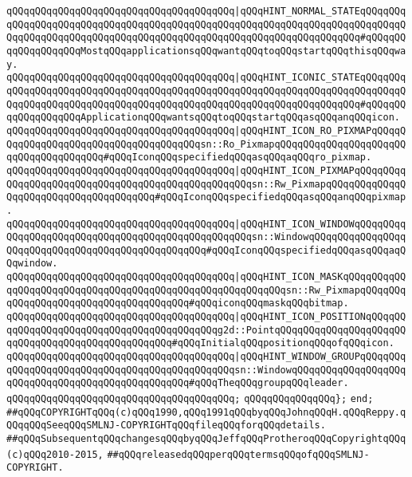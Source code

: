 \verb|qQQqqQQqqQQqqQQqqQQqqQQqqQQqqQQqqQQqqQQq|\verb#|qQQqHINT_NORMAL_STATEqQQqqQQqqQQqqQQqqQQqqQQqqQQqqQQqqQQqqQQqqQQqqQQqqQQqqQQqqQQqqQQqqQQqqQQqqQQqqQQqqQQqqQQqqQQqqQQqqQQqqQQqqQQqqQQqqQQqqQQqqQQqqQQqqQQqqQQqqQQq#\verb|#qQQqqQQqqQQqqQQqqQQqMostqQQqapplicationsqQQqwantqQQqtoqQQqstartqQQqthisqQQqway.|\newline
\verb|qQQqqQQqqQQqqQQqqQQqqQQqqQQqqQQqqQQqqQQq|\verb#|qQQqHINT_ICONIC_STATEqQQqqQQqqQQqqQQqqQQqqQQqqQQqqQQqqQQqqQQqqQQqqQQqqQQqqQQqqQQqqQQqqQQqqQQqqQQqqQQqqQQqqQQqqQQqqQQqqQQqqQQqqQQqqQQqqQQqqQQqqQQqqQQqqQQqqQQqqQQq#\verb|#qQQqqQQqqQQqqQQqqQQqApplicationqQQqwantsqQQqtoqQQqstartqQQqasqQQqanqQQqicon.|\newline
\verb|qQQqqQQqqQQqqQQqqQQqqQQqqQQqqQQqqQQqqQQq|\verb#|qQQqHINT_ICON_RO_PIXMAPqQQqqQQqqQQqqQQqqQQqqQQqqQQqqQQqqQQqqQQqsn::Ro_PixmapqQQqqQQqqQQqqQQqqQQqqQQqqQQqqQQqqQQqqQQq#\verb|#qQQqIconqQQqspecifiedqQQqasqQQqaqQQqro_pixmap.|\newline
\verb|qQQqqQQqqQQqqQQqqQQqqQQqqQQqqQQqqQQqqQQq|\verb#|qQQqHINT_ICON_PIXMAPqQQqqQQqqQQqqQQqqQQqqQQqqQQqqQQqqQQqqQQqqQQqqQQqqQQqsn::Rw_PixmapqQQqqQQqqQQqqQQqqQQqqQQqqQQqqQQqqQQqqQQq#\verb|#qQQqIconqQQqspecifiedqQQqasqQQqanqQQqpixmap.|\newline
\verb|qQQqqQQqqQQqqQQqqQQqqQQqqQQqqQQqqQQqqQQq|\verb#|qQQqHINT_ICON_WINDOWqQQqqQQqqQQqqQQqqQQqqQQqqQQqqQQqqQQqqQQqqQQqqQQqqQQqsn::WindowqQQqqQQqqQQqqQQqqQQqqQQqqQQqqQQqqQQqqQQqqQQqqQQqqQQq#\verb|#qQQqIconqQQqspecifiedqQQqasqQQqaqQQqwindow.|\newline
\verb|qQQqqQQqqQQqqQQqqQQqqQQqqQQqqQQqqQQqqQQq|\verb#|qQQqHINT_ICON_MASKqQQqqQQqqQQqqQQqqQQqqQQqqQQqqQQqqQQqqQQqqQQqqQQqqQQqqQQqqQQqsn::Rw_PixmapqQQqqQQqqQQqqQQqqQQqqQQqqQQqqQQqqQQqqQQq#\verb|#qQQqiconqQQqmaskqQQqbitmap.|\newline
\verb|qQQqqQQqqQQqqQQqqQQqqQQqqQQqqQQqqQQqqQQq|\verb#|qQQqHINT_ICON_POSITIONqQQqqQQqqQQqqQQqqQQqqQQqqQQqqQQqqQQqqQQqqQQqg2d::PointqQQqqQQqqQQqqQQqqQQqqQQqqQQqqQQqqQQqqQQqqQQqqQQqqQQq#\verb|#qQQqInitialqQQqpositionqQQqofqQQqicon.|\newline
\verb|qQQqqQQqqQQqqQQqqQQqqQQqqQQqqQQqqQQqqQQq|\verb#|qQQqHINT_WINDOW_GROUPqQQqqQQqqQQqqQQqqQQqqQQqqQQqqQQqqQQqqQQqqQQqqQQqsn::WindowqQQqqQQqqQQqqQQqqQQqqQQqqQQqqQQqqQQqqQQqqQQqqQQqqQQq#\verb|#qQQqTheqQQqgroupqQQqleader.|\newline
\verb|qQQqqQQqqQQqqQQqqQQqqQQqqQQqqQQqqQQqqQQq;|\newline
\newline
\verb|qQQqqQQqqQQqqQQq};|\newline
\newline
\verb|end;|\newline
\newline
\newline
\verb|##qQQqCOPYRIGHTqQQq(c)qQQq1990,qQQq1991qQQqbyqQQqJohnqQQqH.qQQqReppy.qQQqqQQqSeeqQQqSMLNJ-COPYRIGHTqQQqfileqQQqforqQQqdetails.|\newline
\verb|##qQQqSubsequentqQQqchangesqQQqbyqQQqJeffqQQqProtheroqQQqCopyrightqQQq(c)qQQq2010-2015,|\newline
\verb|##qQQqreleasedqQQqperqQQqtermsqQQqofqQQqSMLNJ-COPYRIGHT.|\newline

